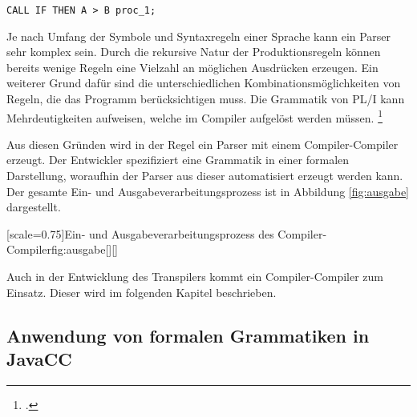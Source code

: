 \begin{lstlisting}[language=PL/I, caption=Ungültiges PL/I, label={lst:pliwrongstatement}]
	CALL IF THEN A > B proc_1;
\end{lstlisting}

Je nach Umfang der Symbole und Syntaxregeln einer Sprache kann ein Parser sehr komplex sein. 
Durch die rekursive Natur der Produktionsregeln können bereits wenige Regeln eine Vielzahl an möglichen Ausdrücken erzeugen.
Ein weiterer Grund dafür sind die unterschiedlichen Kombinationsmöglichkeiten von Regeln, die das Programm berücksichtigen muss. Die Grammatik von PL/I kann Mehrdeutigkeiten aufweisen, welche im Compiler aufgelöst werden müssen. \footcite[Vgl. ][S. 262ff. ]{compibau}

Aus diesen Gründen wird in der Regel ein Parser mit einem Compiler-Compiler erzeugt.
Der Entwickler spezifiziert eine Grammatik in einer formalen Darstellung, woraufhin der Parser aus dieser automatisiert erzeugt werden kann. Der gesamte Ein- und Ausgabeverarbeitungsprozess ist in Abbildung \ref{fig:ausgabe} dargestellt.


[scale=0.75]{Ein- und Ausgabeverarbeitungsprozess des Compiler-Compiler}{fig:ausgabe}[][]

Auch in der Entwicklung des Transpilers kommt ein Compiler-Compiler zum Einsatz. Dieser wird im folgenden Kapitel beschrieben.




     
\pagebreak
\subsection{Anwendung von formalen Grammatiken in JavaCC}

